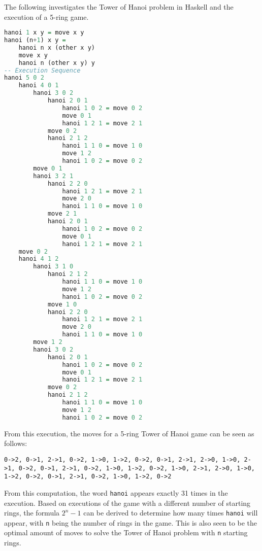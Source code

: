 \documentclass{article}
\theoremstyle{theorem}
\theoremstyle{definition}
\theoremstyle{remark}
\begin{document}
The following investigates the Tower of Hanoi problem in Haskell and the execution of a 5-ring game.
\begin{lstlisting}[language=Haskell]
hanoi 1 x y = move x y
hanoi (n+1) x y = 
    hanoi n x (other x y) 
    move x y 
    hanoi n (other x y) y
-- Execution Sequence
hanoi 5 0 2
    hanoi 4 0 1
        hanoi 3 0 2
            hanoi 2 0 1
                hanoi 1 0 2 = move 0 2
                move 0 1
                hanoi 1 2 1 = move 2 1
            move 0 2
            hanoi 2 1 2
                hanoi 1 1 0 = move 1 0
                move 1 2
                hanoi 1 0 2 = move 0 2
        move 0 1
        hanoi 3 2 1
            hanoi 2 2 0
                hanoi 1 2 1 = move 2 1
                move 2 0
                hanoi 1 1 0 = move 1 0
            move 2 1
            hanoi 2 0 1
                hanoi 1 0 2 = move 0 2
                move 0 1
                hanoi 1 2 1 = move 2 1
    move 0 2
    hanoi 4 1 2
        hanoi 3 1 0
            hanoi 2 1 2
                hanoi 1 1 0 = move 1 0
                move 1 2
                hanoi 1 0 2 = move 0 2
            move 1 0
            hanoi 2 2 0
                hanoi 1 2 1 = move 2 1
                move 2 0
                hanoi 1 1 0 = move 1 0
        move 1 2
        hanoi 3 0 2
            hanoi 2 0 1
                hanoi 1 0 2 = move 0 2
                move 0 1
                hanoi 1 2 1 = move 2 1
            move 0 2
            hanoi 2 1 2
                hanoi 1 1 0 = move 1 0
                move 1 2
                hanoi 1 0 2 = move 0 2
\end{lstlisting} 
From this execution, the moves for a 5-ring Tower of Hanoi game can be seen as follows:
\begin{lstlisting}
0->2, 0->1, 2->1, 0->2, 1->0, 1->2, 0->2, 0->1, 2->1, 2->0, 1->0, 2->1, 0->2, 0->1, 2->1, 0->2, 1->0, 1->2, 0->2, 1->0, 2->1, 2->0, 1->0, 1->2, 0->2, 0->1, 2->1, 0->2, 1->0, 1->2, 0->2
\end{lstlisting}

\noindent From this computation, the word \texttt{hanoi} appears exactly 31 times in the execution. Based on executions of the game with a different number of starting rings, the formula $2^n - 1$ can be derived to determine how many times \texttt{hanoi} will appear, with \texttt{n} being the number of rings in the game. This is also seen to be the optimal amount of moves to solve the Tower of Hanoi problem with \texttt{n} starting rings.

\newpage
\end{document}

